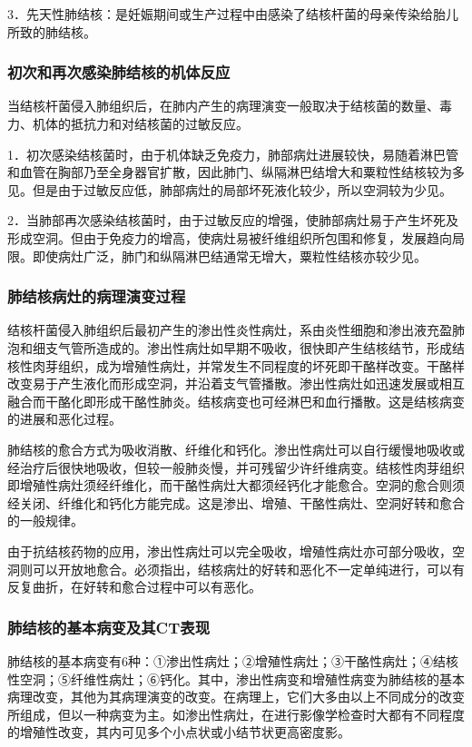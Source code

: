 3．先天性肺结核：是妊娠期间或生产过程中由感染了结核杆菌的母亲传染给胎儿所致的肺结核。

\subsubsection{初次和再次感染肺结核的机体反应}

当结核杆菌侵入肺组织后，在肺内产生的病理演变一般取决于结核菌的数量、毒力、机体的抵抗力和对结核菌的过敏反应。

1．初次感染结核菌时，由于机体缺乏免疫力，肺部病灶进展较快，易随着淋巴管和血管在胸部乃至全身器官扩散，因此肺门、纵隔淋巴结增大和粟粒性结核较为多见。但是由于过敏反应低，肺部病灶的局部坏死液化较少，所以空洞较为少见。

2．当肺部再次感染结核菌时，由于过敏反应的增强，使肺部病灶易于产生坏死及形成空洞。但由于免疫力的增高，使病灶易被纤维组织所包围和修复，发展趋向局限。即使病灶广泛，肺门和纵隔淋巴结通常无增大，粟粒性结核亦较少见。

\subsubsection{肺结核病灶的病理演变过程}

结核杆菌侵入肺组织后最初产生的渗出性炎性病灶，系由炎性细胞和渗出液充盈肺泡和细支气管所造成的。渗出性病灶如早期不吸收，很快即产生结核结节，形成结核性肉芽组织，成为增殖性病灶，并常发生不同程度的坏死即干酪样改变。干酪样改变易于产生液化而形成空洞，并沿着支气管播散。渗出性病灶如迅速发展或相互融合而干酪化即形成干酪性肺炎。结核病变也可经淋巴和血行播散。这是结核病变的进展和恶化过程。

肺结核的愈合方式为吸收消散、纤维化和钙化。渗出性病灶可以自行缓慢地吸收或经治疗后很快地吸收，但较一般肺炎慢，并可残留少许纤维病变。结核性肉芽组织即增殖性病灶须经纤维化，而干酪性病灶大都须经钙化才能愈合。空洞的愈合则须经关闭、纤维化和钙化方能完成。这是渗出、增殖、干酪性病灶、空洞好转和愈合的一般规律。

由于抗结核药物的应用，渗出性病灶可以完全吸收，增殖性病灶亦可部分吸收，空洞则可以开放地愈合。必须指出，结核病灶的好转和恶化不一定单纯进行，可以有反复曲折，在好转和愈合过程中可以有恶化。

\subsubsection{肺结核的基本病变及其CT表现}

肺结核的基本病变有6种：①渗出性病灶；②增殖性病灶；③干酪性病灶；④结核性空洞；⑤纤维性病灶；⑥钙化。其中，渗出性病变和增殖性病变为肺结核的基本病理改变，其他为其病理演变的改变。在病理上，它们大多由以上不同成分的改变所组成，但以一种病变为主。如渗出性病灶，在进行影像学检查时大都有不同程度的增殖性改变，其内可见多个小点状或小结节状更高密度影。

